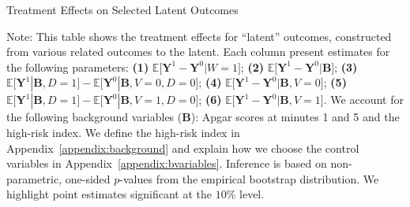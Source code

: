 
\begin{table}[H]
\centering
\begin{threeparttable}
\caption{Treatment Effects on Selected Latent Outcomes}\label{table:treatfactors}
\begin{scriptsize}

\end{scriptsize}
\begin{tablenotes}
\tiny
Note: This table shows the treatment effects for ``latent'' outcomes, constructed from various related outcomes to the latent. Each column present estimates for the following parameters: \textbf{(1)} $\mathbb{E} \big[ \bm{Y}^1 - \bm{Y}^0 | W = 1]$; {\textbf{(2)} $\mathbb{E} \big[ \bm{Y}^1 - \bm{Y}^0 | \bm{B} \big]$}; {\textbf{(3)} $\mathbb{E} \big[ \bm{Y}^1 | \bm{B}, D=1 \big] - \mathbb{E} \big[ \bm{Y}^0 | \bm{B}, V=0, D=0 \big]$}; {\textbf{(4)} $\mathbb{E} \big[ \bm{Y}^1 - \bm{Y}^0 | \bm{B}, V=0 \big] $}; {\textbf{(5)} $\mathbb{E} \big[ \bm{Y}^1 | \bm{B}, D=1 \big] - \mathbb{E} \big[ \bm{Y}^0 | \bm{B}, V=1, D = 0 \big]$}; {\textbf{(6)} $\mathbb{E} \big[ \bm{Y}^1 - \bm{Y}^0 | \bm{B}, V=1 \big]$}. We account for the following background variables ($\bm{B}$): Apgar scores at minutes 1 and 5 and the high-risk index. We define the high-risk index in Appendix~\ref{appendix:background} and explain how we choose the control variables in Appendix~\ref{appendix:bvariables}. Inference is based on non-parametric, one-sided $p$-values from the empirical bootstrap distribution. We highlight point estimates significant at the $10\%$ level.
\end{tablenotes}
\end{threeparttable}
\end{table}
\doublespacing



\doublespacing
